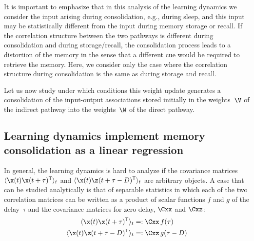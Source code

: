 It is important to emphasize that in this analysis of the learning dynamics we consider the input arising during consolidation, e.g., during sleep, and this input may be statistically different from the input during memory storage or recall. If the correlation structure between the two pathways is different during consolidation and during storage/recall, the consolidation process leads to a distortion of the memory in the sense that a different cue would be required to retrieve the memory. Here, we consider only the case where the correlation structure during consolidation is the same as during storage and recall.

Let us now study under which conditions this weight update generates a consolidation of the input-output associations stored initially in the weights~$\V$ of the indirect pathway into the weights~$\W$ of the direct pathway.


\subsection{Learning dynamics implement memory consolidation as a linear regression}
\label{ssec:theory_dynamics}

In general, the learning dynamics is hard to analyze if the covariance matrices $\langle  \x(t) \x(t+\tau)^\mathsf{T} \rangle_t$ and $\langle  \x(t) \z(t+\tau-D)^\mathsf{T} \rangle_t$ are arbitrary objects. A case that can be studied analytically is that of separable statistics in which each of the two correlation matrices can be written as a product of scalar functions $f$ and $g$ of the delay~$\tau$ and the covariance matrices for zero delay, $\Cxx$ and $\Cxz$:
\begin{align}
\langle  \x(t) \x(t+\tau )^\mathsf{T} \rangle_t & =:
\Cxx \, f(\tau)
\label{eq:definition_f}
\\
\langle  \x(t) \z(t+\tau-D )^\mathsf{T} \rangle_t &=:
\Cxz \, g(\tau-D)
\label{eq:definition_g}
\end{align}

